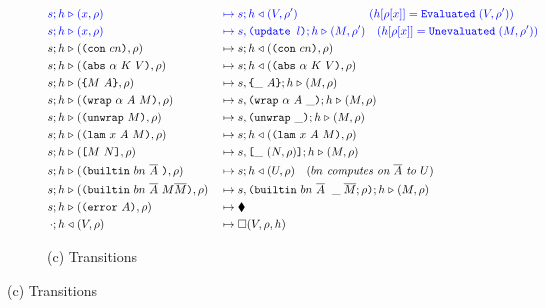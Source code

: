 \begin{figure}
\hspace{-25mm}\begin{subfigure}[c]{\linewidth}   %
{
\small
\caption*{\hspace{50mm}(c) Transitions}
\begin{alignat*}{2}\\
      \blue{s;h} &\bcompute \blue{(x, \rho)}        &{}\bmapsto{}& \blue{s;h \return (V,\rho^{\prime})  \hspace{62pt} (h[\rho[x]] = \texttt{Evaluated}\; (V, \rho^{\prime}))}\\  %
      \blue{s;h} &\bcompute \blue{(x, \rho)}        &{}\bmapsto{}& \blue{s,\texttt{(update\ $l$)}; h \compute (M,\rho^{\prime}) \quad (h[\rho[x]] = \texttt{Unevaluated}\; (M,\rho^{\prime}))}\\  %
      s;h &\compute (\con{cn}, \rho)               &{}\mapsto{}& s;h \return (\con{cn}, \rho)\\
      s;h &\compute (\abs{\alpha}{K}{V}, \rho)      &{}\mapsto{}& s;h \return (\abs{\alpha}{K}{V}, \rho)\\
      s;h &\compute (\inst{M}{A}, \rho)             &{}\mapsto{}& s,\inInstLeftFrame{A}; h \compute (M,\rho)\\
      s;h &\compute (\wrap{\alpha}{A}{M}, \rho)     &{}\mapsto{}& s,\inWrapRightFrame{\alpha}{A};h \compute (M, \rho)\\
      s;h &\compute (\unwrap{M}, \rho)              &{}\mapsto{}& s, \inUnwrapFrame{};h \compute (M,\rho)\\
      s;h &\compute (\lam{x}{A}{M}, \rho)           &{}\mapsto{}& s;h \return (\lam{x}{A}{M}, \rho)\\
      s;h &\compute (\app{M}{N}, \rho)              &{}\mapsto{}& s,\inAppLeftFrame{(N, \rho)};h \compute (M,\rho)\\
      s;h &\compute (\builtin{bn}{\repetition{A}}{}, \rho) 
                                                    &{}\mapsto{}& s;h \return (U,\rho) \quad (\textit{$bn$ computes on $\repetition{A}$ to $U$})\\
      s;h &\compute (\builtin{bn}{\repetition{A}}{M \repetition{M}}, \rho) 
                                                    &{}\mapsto{}& s,\inBuiltin{bn}{\repetition{A}}{}{\_}{\repetition{M}; \rho};h \compute (M, \rho)\\
      s;h &\compute (\error{A}, \rho) &{}\mapsto{}& \ckerror{}\\
      \cdot;h &\return (V, \rho) &{}\mapsto{}& \square(V, \rho, h)\\

\end{alignat*}}
\end{subfigure}
\end{figure}
